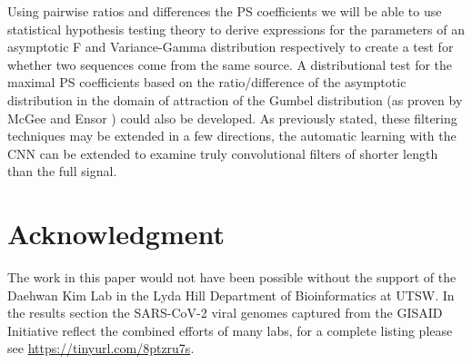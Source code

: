 \documentclass[10pt,conference]{IEEEtran}
\begin{document}
Using pairwise ratios and differences the PS coefficients we will be able to use statistical hypothesis testing theory to derive expressions for the parameters of an asymptotic F and Variance-Gamma distribution respectively to create a test for whether two sequences come from the same source.  
A distributional test for the maximal PS coefficients based on the ratio/difference of the asymptotic distribution in the domain of attraction of the Gumbel distribution (as proven by McGee and Ensor \cite{mcg98}) could also be developed. 
As previously stated, these filtering techniques may be extended in a few directions, the automatic learning with the CNN can be extended to examine truly convolutional filters of shorter length than the full signal. 


\appendices

\section*{Acknowledgment}
The work in this paper would not have been possible without the support of the Daehwan Kim Lab in 
the Lyda Hill Department of Bioinformatics at UTSW.  In the results section the SARS-CoV-2 viral 
genomes captured from the GISAID Initiative \cite{gisaid} reflect the combined efforts of many labs, 
for a complete listing please see \url{https://tinyurl.com/8ptzru7s}.



\end{document}
